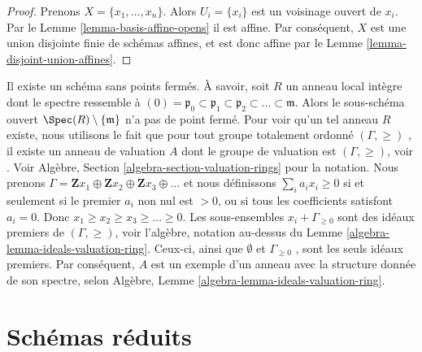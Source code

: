 \begin{proof}
Prenons  $X = \{x_1, \ldots, x_n\}$. Alors  $U_i = \{x_i\}$  est un voisinage ouvert de  $x_i$.
Par le Lemme  \ref{lemma-basis-affine-opens}  il est affine. Par conséquent,  $X$  est une
union disjointe finie de schémas affines, et est donc affine par le Lemme
 \ref{lemma-disjoint-union-affines}.
\end{proof}

\begin{example}
\label{example-scheme-without-closed-points}
Il existe un schéma sans points fermés. À savoir, soit  $R$  un anneau
local intègre dont le spectre ressemble à  $(0) = \mathfrak p_0 \subset \mathfrak p_1 \subset \mathfrak p_2
\subset \ldots \subset \mathfrak m$. Alors le sous-schéma ouvert
 $\Spec(R) \setminus \{\mathfrak m\}$  n'a pas de point fermé. Pour voir qu'un tel anneau  $R$ 
existe, nous utilisons le fait que pour tout groupe totalement ordonné
 $(\Gamma, \geq)$ , il existe un anneau de valuation  $A$  dont le groupe de
valuation est  $(\Gamma, \geq)$, voir  \cite{Krull}. Voir Algèbre, Section  \ref{algebra-section-valuation-rings}  pour
la notation. Nous prenons  $\Gamma = \mathbf{Z}x_1 \oplus \mathbf{Z}x_2 \oplus \mathbf{Z}x_3 \oplus
\ldots$  et nous définissons  $\sum_i a_i x_i \geq 0$  si et
seulement si le premier  $a_i$  non nul est  $> 0$, ou si tous les coefficients satisfont
 $a_i = 0$. Donc  $x_1 \geq x_2 \geq x_3 \geq  \ldots \geq 0$. Les sous-ensembles  $x_i + \Gamma_{\geq 0}$  sont des idéaux
premiers de  $(\Gamma, \geq)$, voir l'algèbre, notation au-dessus du Lemme
 \ref{algebra-lemma-ideals-valuation-ring}. Ceux-ci, ainsi que  $\emptyset$  et  $\Gamma_{\geq 0}$ , sont les seuls
idéaux premiers. Par conséquent,  $A$  est un exemple d'un anneau avec la
structure donnée de son spectre, selon Algèbre, Lemme  \ref{algebra-lemma-ideals-valuation-ring}.
\end{example}



















\section{Schémas réduits}
\label{section-reduced}

